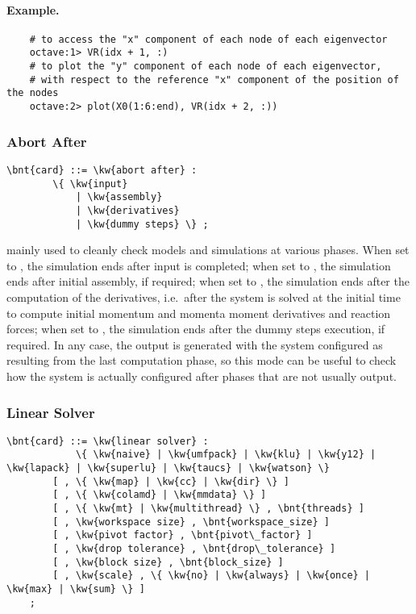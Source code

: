 \paragraph{Example.}
\begin{verbatim}
    # to access the "x" component of each node of each eigenvector
    octave:1> VR(idx + 1, :)
    # to plot the "y" component of each node of each eigenvector,
    # with respect to the reference "x" component of the position of the nodes
    octave:2> plot(X0(1:6:end), VR(idx + 2, :))
\end{verbatim}



\subsubsection{Abort After}
\label{sec:IVP:abort after}
\begin{Verbatim}[commandchars=\\\{\}]
    \bnt{card} ::= \kw{abort after} :
        \{ \kw{input} 
            | \kw{assembly}
            | \kw{derivatives}
            | \kw{dummy steps} \} ;
\end{Verbatim}
mainly used to cleanly check models and simulations at various phases.
When set to , the simulation ends after input is completed;
when set to , the simulation ends after initial assembly,
if required;
when set to , the simulation ends after the computation
of the derivatives, i.e.\ after the system is solved at the initial
time to compute initial momentum and momenta moment derivatives and 
reaction forces;
when set to , the simulation ends after the dummy steps
execution, if required.
In any case, the output is generated with the system configured 
as resulting from the last computation phase, so this mode can be useful 
to check how the system is actually configured after phases that are not 
usually output.


\subsubsection{Linear Solver}   
\label{sec:LINEAR-SOLVER}
\begin{Verbatim}[commandchars=\\\{\}]
    \bnt{card} ::= \kw{linear solver} :
            \{ \kw{naive} | \kw{umfpack} | \kw{klu} | \kw{y12} | \kw{lapack} | \kw{superlu} | \kw{taucs} | \kw{watson} \}
        [ , \{ \kw{map} | \kw{cc} | \kw{dir} \} ]
        [ , \{ \kw{colamd} | \kw{mmdata} \} ]
        [ , \{ \kw{mt} | \kw{multithread} \} , \bnt{threads} ]
        [ , \kw{workspace size} , \bnt{workspace_size} ] 
        [ , \kw{pivot factor} , \bnt{pivot\_factor} ]
        [ , \kw{drop tolerance} , \bnt{drop\_tolerance} ]
        [ , \kw{block size} , \bnt{block_size} ]
        [ , \kw{scale} , \{ \kw{no} | \kw{always} | \kw{once} | \kw{max} | \kw{sum} \} ]
    ;
\end{Verbatim}

